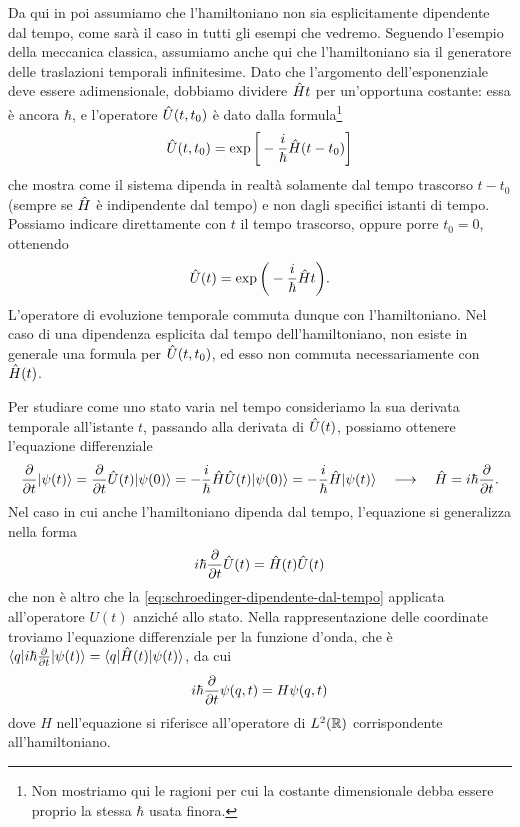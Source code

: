 Da qui in poi assumiamo che l'hamiltoniano non sia esplicitamente dipendente dal tempo, come sarà il caso in tutti gli esempi che vedremo.
Seguendo l'esempio della meccanica classica, assumiamo anche qui che l'hamiltoniano sia il generatore delle traslazioni temporali infinitesime.
Dato che l'argomento dell'esponenziale deve essere adimensionale, dobbiamo dividere $\op Ht$ per un'opportuna costante: essa è ancora $\hbar$, e l'operatore $\op U(t,t_0)$ è dato dalla formula\footnote{Non mostriamo qui le ragioni per cui la costante dimensionale debba essere proprio la stessa $\hbar$ usata finora.}
\begin{equation}
	\op U(t,t_0)=\exp\bigg[-\frac{i}{\hbar}\op H(t-t_0)\bigg]
	\label{eq:operatore-evoluzione-temporale}
\end{equation}
che mostra come il sistema dipenda in realtà solamente dal tempo trascorso $t-t_0$ (sempre se $\op H$ è indipendente dal tempo) e non dagli specifici istanti di tempo.
Possiamo indicare direttamente con $t$ il tempo trascorso, oppure porre $t_0=0$, ottenendo
\begin{equation}
	\op U(t)=\exp\bigg(-\frac{i}{\hbar}\op Ht\bigg).
\end{equation}
L'operatore di evoluzione temporale commuta dunque con l'hamiltoniano.
Nel caso di una dipendenza esplicita dal tempo dell'hamiltoniano, non esiste in generale una formula per $\op U(t,t_0)$, ed esso non commuta necessariamente con $\op H(t)$.

Per studiare come uno stato varia nel tempo consideriamo la sua derivata temporale all'istante $t$, passando alla derivata di $\op U(t)$, possiamo ottenere l'equazione differenziale
\begin{equation}
	\drp{}{t}\ket{\psi(t)}=\drp{}{t}\op U(t)\ket{\psi(0)}=-\frac{i}{\hbar}\op H\op U(t)\ket{\psi(0)}=-\frac{i}{\hbar}\op H\ket{\psi(t)}\quad\longrightarrow\quad \op H=i\hbar\drp{}{t}.
\end{equation}
Nel caso in cui anche l'hamiltoniano dipenda dal tempo, l'equazione si generalizza nella forma
\begin{equation}
	i\hbar\drp{}{t}\op U(t)=\op H(t)\op U(t)
	\label{eq:schrodinger-tempo}
\end{equation}
che non è altro che la \eqref{eq:schroedinger-dipendente-dal-tempo} applicata all'operatore $U(t)$ anzich\'e allo stato.
Nella rappresentazione delle coordinate troviamo l'equazione differenziale per la funzione d'onda, che è $\bra{q}i\hbar\drp{}{t}\ket{\psi(t)}=\bra{q}\op H(t)\ket{\psi(t)}$, da cui
\begin{equation}
	i\hbar\drp{}{t}\psi(q,t)=H\psi(q,t)
	\label{eq:schrodinger-tempo-coordinate}
\end{equation}
dove $H$ nell'equazione si riferisce all'operatore di $\leb[2]{\R}$ corrispondente all'hamiltoniano.

